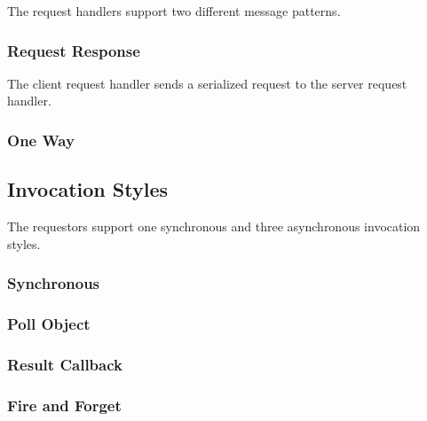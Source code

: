 The request handlers support two different message patterns.

\subsubsection{Request Response}

The client request handler sends a serialized request to the server request handler.

\subsubsection{One Way}

\subsection{Invocation Styles}

The requestors support one synchronous and three asynchronous invocation styles.

\subsubsection{Synchronous}

\subsubsection{Poll Object}

\subsubsection{Result Callback}

\subsubsection{Fire and Forget}
